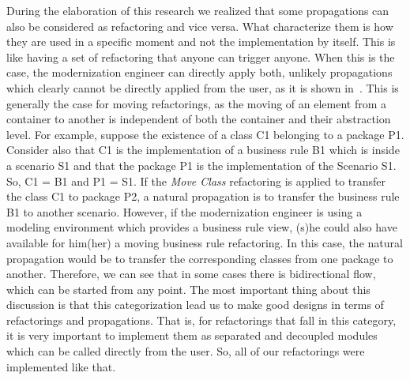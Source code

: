 During the elaboration of this research we realized that some propagations can also be considered as refactoring and vice versa. What characterize them is how they are used in a specific moment and not the implementation by itself. This is like having a set of refactoring that anyone can trigger anyone. When this is the case, the modernization engineer can directly apply both, unlikely propagations which clearly cannot be directly applied from the user, as it is shown in~\cite{ICSOFT2014_Winetzhammer}. This is generally the case for moving refactorings, as the moving of an element from a container to another is independent of both the container and their abstraction level. For example, suppose the existence of a class C1 belonging to a package P1. Consider also that C1 is the implementation of a business rule B1 which is inside a scenario S1 and that the package P1 is the implementation of the Scenario S1. So, C1 = B1 and P1 = S1. If the \textit{Move Class} refactoring is applied to transfer the class C1 to package P2, a natural propagation is to transfer the business rule B1 to another scenario. However, if the modernization engineer is using a modeling environment which provides a business rule view, (s)he could also have available for him(her) a moving business rule refactoring. In this case, the natural propagation would be to transfer the corresponding classes from one package to another. Therefore, we can see that in some cases there is bidirectional flow, which can be started from any point. 
%
%
%
The most important thing about this discussion is that this categorization lead us to make good designs in terms of refactorings and propagations. That is, for refactorings that fall in this category, it is very important to implement them as separated and decoupled modules which can be called directly from the user. So, all of our refactorings were implemented like that. 
